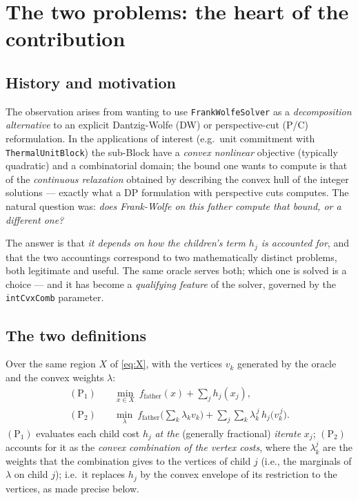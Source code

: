 \documentclass[11pt,a4paper]{article}
\newcommand{\ffat}{f_{\mathrm{father}}}
\newcommand{\code}[1]{\texttt{#1}}
\newcommand{\Pone}{(\mathrm{P}_1)}
\newcommand{\Ptwo}{(\mathrm{P}_2)}
\theoremstyle{plain}
\theoremstyle{remark}
\begin{document}
\section{The two problems: the heart of the contribution}\label{sec:twoproblems}

\subsection{History and motivation}

The observation arises from wanting to use \code{FrankWolfeSolver} as a
\emph{decomposition alternative} to an explicit Dantzig-Wolfe (DW) or
perspective-cut (P/C) reformulation. In the applications of interest (e.g.\ unit
commitment with \code{ThermalUnitBlock}) the sub-Block have a \emph{convex
nonlinear} objective (typically quadratic) and a combinatorial domain; the bound
one wants to compute is that of the \emph{continuous relaxation} obtained by
describing the convex hull of the integer solutions --- exactly what a DP
formulation with perspective cuts computes. The natural question was: \emph{does
Frank-Wolfe on this father compute that bound, or a different one?}

The answer is that \emph{it depends on how the children's term $h_j$ is
accounted for}, and that the two accountings correspond to two mathematically
distinct problems, both legitimate and useful. The same oracle serves both; which
one is solved is a choice --- and it has become a \emph{qualifying feature} of the
solver, governed by the \code{intCvxComb} parameter.

\subsection{The two definitions}

Over the same region $X$ of \eqref{eq:X}, with the vertices $v_k$ generated by the
oracle and the convex weights $\lambda$:
\begin{align}
  \Pone\quad & \min_{x\in X}\ \ffat(x) + \sum_j h_j(x_j),
    \label{eq:P1}\\[2pt]
  \Ptwo\quad & \min_{\lambda}\ \ffat\!\Big(\textstyle\sum_k \lambda_k v_k\Big)
    + \sum_j \sum_k \lambda_k^{\,j}\, h_j\big(v_k^{\,j}\big).
    \label{eq:P2}
\end{align}
$\Pone$ evaluates each child cost $h_j$ \emph{at the} (generally fractional)
\emph{iterate} $x_j$; $\Ptwo$ accounts for it as the \emph{convex combination of
the vertex costs}, where the $\lambda^j_k$ are the weights that the combination
gives to the vertices of child $j$ (i.e., the marginals of $\lambda$ on child
$j$); i.e.\ it replaces $h_j$ by the convex envelope of its restriction to the
vertices, as made precise below.
\end{document}
